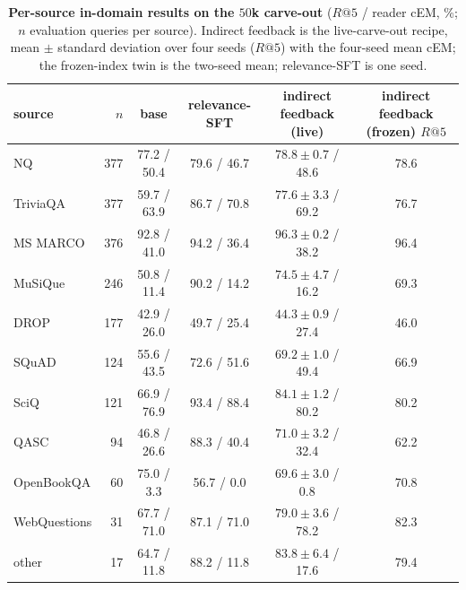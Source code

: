 \begin{table}[H]
\centering\small
\caption{\textbf{Per-source in-domain results on the $50$k carve-out} ($R@5$ / reader cEM, \%; $n$ evaluation
queries per source). Indirect feedback is the live-carve-out recipe, mean $\pm$ standard deviation over four
seeds ($R@5$) with the four-seed mean cEM; the frozen-index twin is the two-seed mean; relevance-SFT is one seed.}
\label{tab:rag_persource}
\begin{tabular}{lrcccc}
\toprule
source & $n$ & base & relevance-SFT & indirect feedback (live) & indirect feedback (frozen) $R@5$ \\
\midrule
NQ & 377 & 77.2 / 50.4 & 79.6 / 46.7 & $78.8 \pm 0.7$ / 48.6 & 78.6 \\
TriviaQA & 377 & 59.7 / 63.9 & 86.7 / 70.8 & $77.6 \pm 3.3$ / 69.2 & 76.7 \\
MS MARCO & 376 & 92.8 / 41.0 & 94.2 / 36.4 & $96.3 \pm 0.2$ / 38.2 & 96.4 \\
MuSiQue & 246 & 50.8 / 11.4 & 90.2 / 14.2 & $74.5 \pm 4.7$ / 16.2 & 69.3 \\
DROP & 177 & 42.9 / 26.0 & 49.7 / 25.4 & $44.3 \pm 0.9$ / 27.4 & 46.0 \\
SQuAD & 124 & 55.6 / 43.5 & 72.6 / 51.6 & $69.2 \pm 1.0$ / 49.4 & 66.9 \\
SciQ & 121 & 66.9 / 76.9 & 93.4 / 88.4 & $84.1 \pm 1.2$ / 80.2 & 80.2 \\
QASC & 94 & 46.8 / 26.6 & 88.3 / 40.4 & $71.0 \pm 3.2$ / 32.4 & 62.2 \\
OpenBookQA & 60 & 75.0 / 3.3 & 56.7 / 0.0 & $69.6 \pm 3.0$ / 0.8 & 70.8 \\
WebQuestions & 31 & 67.7 / 71.0 & 87.1 / 71.0 & $79.0 \pm 3.6$ / 78.2 & 82.3 \\
other & 17 & 64.7 / 11.8 & 88.2 / 11.8 & $83.8 \pm 6.4$ / 17.6 & 79.4 \\
\bottomrule
\end{tabular}
\end{table}

